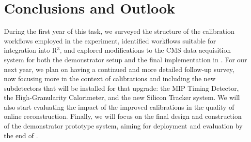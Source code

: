 \chapter{Conclusions and Outlook} \label{sec:conclusions_and_outlook}

During the first year of this task, 
we surveyed the structure of the calibration workflows employed in the experiment, 
identified workflows suitable for integration into R$^3$, 
and explored modifications to the CMS data acquisition system for both the demonstrator setup and the final implementation in \Phasetwo.
For our next year, we plan on having a continued and more detailed follow-up survey, 
now focusing more in the context of \Phasetwo calibrations and including the new subdetectors that will be installed for that upgrade: 
the MIP Timing Detector,
the High-Granularity Calorimeter,
and the
new Silicon Tracker system.
We will also start evaluating the impact of the improved calibrations in the quality of online reconstruction.
Finally, we will focus on the final design and construction of the demonstrator prototype system, aiming for  deployment and evaluation by the end of \Runthree.